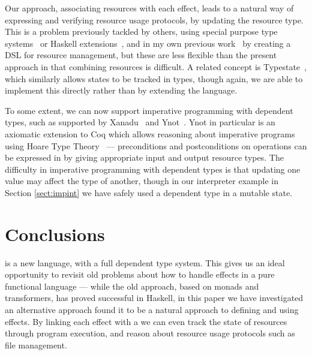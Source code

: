Our approach, associating resources with each effect,
leads to a natural way of expressing and verifying resource usage protocols,
by updating the resource type. This is a problem previously tackled by
others, using special purpose type systems~\cite{Walker2000} 
or Haskell extensions~\cite{McBride2011}, and in my own previous
work~\cite{Brady2010a,bradyresource} by creating a DSL for resource management,
but these are less flexible than the present approach in that
combining resources is difficult. 
A related concept is
Typestate~\cite{Aldrich2009,Strom1986}, which similarly allows states to
be tracked in types, though again, we are able to implement this directly
rather than by extending the language. 

To some extent, we can now support imperative programming with dependent
types, such as supported by Xanadu~\cite{Xi2000} and Ynot~\cite{Ynot2008}. 
Ynot in particular is an axiomatic extension to Coq which allows reasoning
about imperative programs using Hoare Type Theory~\cite{HoareTT2008} ---
preconditions and postconditions on operations can be expressed in \Eff{} by
giving appropriate input and output resource types.
%
The difficulty in imperative programming with dependent types is that
updating one value may affect the type of another, though in our interpreter
example in Section \ref{sect:impint} we have safely used a dependent type
in a mutable state.


\section{Conclusions}

\label{sect:conclusion}

\Idris{} is a new language, with a full dependent type system. 
This gives us an ideal opportunity to revisit old problems
about how to handle effects in a pure functional language --- while the old
approach, based on monads and transformers, has proved successful in
Haskell, in this paper we have investigated an alternative approach 
found it to be a natural approach to defining and using effects.
By linking each effect with a  we can even track the state
of resources through program execution, and reason about resource usage
protocols such as file management. 

